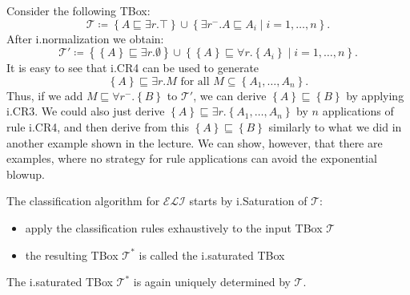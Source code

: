 \begin{example}
	Consider the following TBox:
	\[
	\mathcal{T} \coloneqq \left\{ A \sqsubseteq \exists r.\top \right\} \cup \left\{ \exists r^-.A \sqsubseteq A_i \mid i= 1, \ldots, n\right\}
	.\]
	After i.normalization we obtain:
	\[
		\mathcal{T}' \coloneqq \left\{ \left\{ A \right\} \sqsubseteq \exists r.\emptyset \right\} \cup \left\{ \left\{ A \right\} \sqsubseteq \forall r.\left\{ A_i \right\} \mid i = 1, \ldots, n \right\}
	.\]
	It is easy to see that i.CR4 can be used to generate
	\[
	\left\{ A \right\} \sqsubseteq \exists r.M \text{ for all } M \subseteq \left\{ A_1, \ldots, A_n \right\}
	.\]
	Thus, if we add $M \sqsubseteq \forall r^-.\left\{ B \right\}$ to $\mathcal{T}'$,
	we can derive $\left\{ A \right\} \sqsubseteq \left\{ B \right\}$ by applying i.CR3.
	We could also just derive $\left\{ A \right\} \sqsubseteq \exists r.\left\{ A_1, \ldots, A_n \right\}$
	by $n$ applications of rule i.CR4,
	and then derive from this $\left\{ A \right\} \sqsubseteq \left\{ B \right\}$
	similarly to what we did in another example shown in the lecture.
	We can show, however, that there are examples, where no strategy for rule applications can avoid the exponential blowup.
\end{example}
The classification algorithm for $\mathcal{ELI}$ starts by i.Saturation of $\mathcal{T}$:
\begin{itemize}
	\item apply the classification rules exhaustively to the input TBox $\mathcal{T}$ 
	\item the resulting TBox $\mathcal{T}^*$ is called the i.saturated TBox
\end{itemize}
The i.saturated TBox $\mathcal{T}^*$ is again uniquely determined by $\mathcal{T}$.

